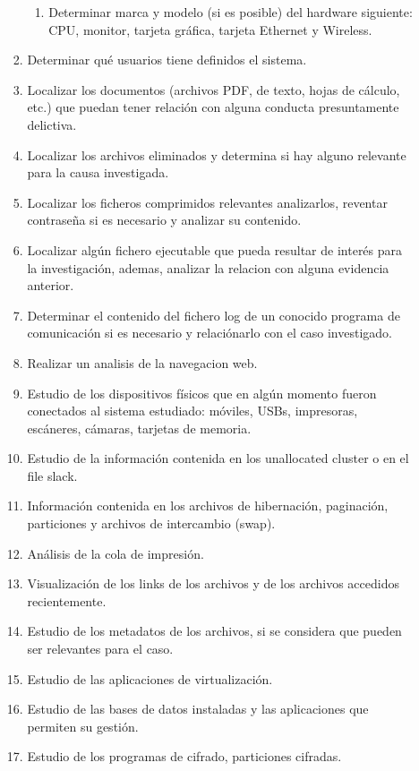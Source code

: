 \begin{enumerate}
\begin{enumerate}
\begin{enumerate}
\begin{enumerate}
                \item Determinar marca y modelo (si es posible) del hardware siguiente: CPU, monitor, tarjeta gráfica, tarjeta Ethernet y Wireless.
            \end{enumerate}
            \item Determinar qué usuarios tiene definidos el sistema.
            \item Localizar los documentos (archivos PDF, de texto, hojas de cálculo, etc.) que puedan tener relación con alguna conducta presuntamente delictiva.
            \item Localizar los archivos eliminados y determina si hay alguno relevante para la causa investigada.
            \item Localizar los ficheros comprimidos relevantes analizarlos, reventar contraseña si es necesario y analizar su contenido.
            \item Localizar algún fichero ejecutable que pueda resultar de interés para la investigación, ademas, analizar la relacion con alguna evidencia anterior.
            \item Determinar el contenido del fichero log de un conocido programa de comunicación si es necesario y relaciónarlo con el caso investigado.
            \item Realizar un analisis de la navegacion web.
            \item Estudio de los dispositivos físicos que en algún momento fueron conectados al sistema estudiado: móviles, USBs, impresoras, escáneres, cámaras, tarjetas de memoria.
            \item Estudio de la información contenida en los unallocated cluster o en el file slack.
            \item Información contenida en los archivos de hibernación, paginación, particiones y archivos de intercambio (swap).
            \item Análisis de la cola de impresión.
            \item Visualización de los links de los archivos y de los archivos accedidos recientemente.
            \item Estudio de los metadatos de los archivos, si se considera que pueden ser relevantes para el caso.
            \item Estudio de las aplicaciones de virtualización.
            \item Estudio de las bases de datos instaladas y las aplicaciones que permiten su gestión.
            \item Estudio de los programas de cifrado, particiones cifradas.

\end{enumerate}
\end{enumerate}
\end{enumerate}
